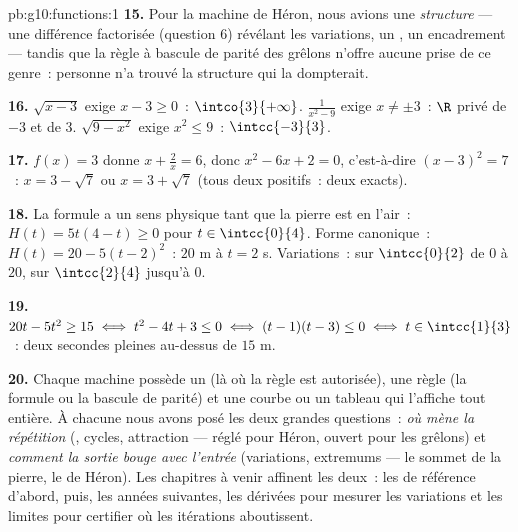 \begin{solution}{pb:g10:functions:1}
\textbf{15.} Pour la machine de Héron, nous avions une
\emph{structure} --- une différence factorisée (question 6) révélant
les variations, un , un encadrement --- tandis que la règle à
bascule de parité des grêlons n'offre aucune prise de ce genre~:
personne n'a trouvé la structure qui la dompterait.

\textbf{16.} $\sqrt{x - 3}$ exige $x - 3 \geq 0$~:
$\intco{3}{+\infty}$. $\frac{1}{x^2 - 9}$ exige $x \neq \pm 3$~:
$\R$ privé de $-3$ et de $3$. $\sqrt{9 - x^2}$ exige $x^2 \leq 9$~:
$\intcc{-3}{3}$.

\textbf{17.} $f(x) = 3$ donne $x + \frac2x = 6$, donc
$x^2 - 6x + 2 = 0$, c'est-à-dire $(x - 3)^2 = 7$~:
$x = 3 - \sqrt7$ ou $x = 3 + \sqrt7$ (tous deux positifs~: deux
 exacts).

\textbf{18.} La formule a un sens physique tant que la pierre est en
l'air~: $H(t) = 5t(4 - t) \geq 0$ pour $t \in \intcc{0}{4}$. Forme
canonique~: $H(t) = 20 - 5(t - 2)^2$~:  $20$ m à $t = 2$ s.
Variations~:  sur $\intcc{0}{2}$ de $0$ à $20$,
 sur $\intcc{2}{4}$ jusqu'à $0$.

\textbf{19.} $20t - 5t^2 \geq 15 \iff t^2 - 4t + 3 \leq 0 \iff
(t - 1)(t - 3) \leq 0 \iff t \in \intcc{1}{3}$~: deux secondes
pleines au-dessus de $15$ m.

\textbf{20.} Chaque machine possède un  (là où
la règle est autorisée), une règle (la formule ou la bascule de
parité) et une courbe ou un tableau qui l'affiche tout entière. À
chacune nous avons posé les deux grandes questions~: \emph{où mène la
répétition} (, cycles, attraction --- réglé pour Héron,
ouvert pour les grêlons) et \emph{comment la sortie bouge avec
l'entrée} (variations, extremums --- le sommet de la pierre, le
 de Héron). Les chapitres à venir affinent les deux~: les
 de référence d'abord, puis, les années suivantes, les
dérivées pour mesurer les variations et les limites pour certifier
où les itérations aboutissent.
\end{solution}
